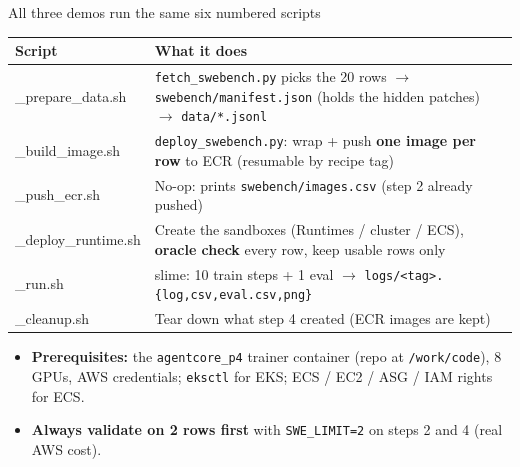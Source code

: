 \begin{frame}{All three demos run the same six numbered scripts}
\scriptsize
\begin{tabularx}{\textwidth}{@{}>{\ttfamily}p{3.6cm}X@{}}
\toprule
\textrm{\textbf{Script}} & \textbf{What it does}\\
\midrule
1\_prepare\_data.sh & \texttt{fetch\_swebench.py} picks the 20 rows $\rightarrow$ \texttt{swebench/manifest.json} (holds the hidden patches) $\rightarrow$ \texttt{data/*.jsonl}\\
2\_build\_image.sh & \texttt{deploy\_swebench.py}: wrap + push \textbf{one image per row} to ECR (resumable by recipe tag)\\
3\_push\_ecr.sh & No-op: prints \texttt{swebench/images.csv} (step 2 already pushed)\\
4\_deploy\_runtime.sh & Create the sandboxes (Runtimes / cluster / ECS), \textbf{oracle check} every row, keep usable rows only\\
5\_run.sh & slime: 10 train steps + 1 eval $\rightarrow$ \texttt{logs/<tag>.\{log,csv,eval.csv,png\}}\\
6\_cleanup.sh & Tear down what step 4 created (ECR images are kept)\\
\bottomrule
\end{tabularx}
\par\vspace{2mm}
\begin{itemize}\scriptsize\setlength{\itemsep}{0.4mm}
\item \textbf{Prerequisites:} the \texttt{agentcore\_p4} trainer container (repo at \texttt{/work/code}), 8 GPUs, AWS credentials; \texttt{eksctl} for EKS; ECS / EC2 / ASG / IAM rights for ECS.
\item \textbf{Always validate on 2 rows first} with \texttt{SWE\_LIMIT=2} on steps 2 and 4 (real AWS cost).
\end{itemize}
\end{frame}

